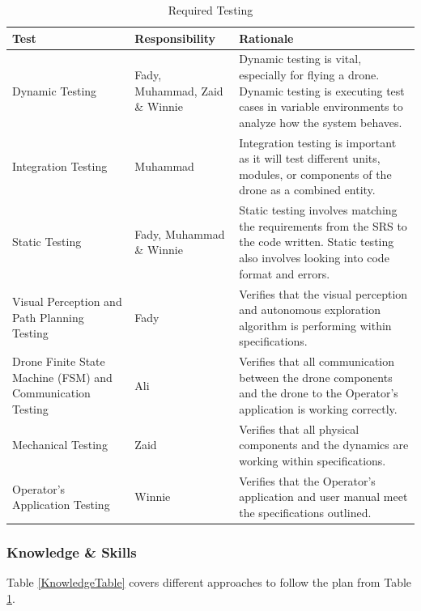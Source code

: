 \documentclass[12pt, titlepage]{article}
\begin{document}
  
\begin{table}[!h]
\begin{center}
\caption {Required Testing}
\label{RequiredTesting}
\begin{tabular}{ | m{3cm} | m{3cm} | m{8cm} | }
\hline
Test & Responsibility & Rationale\\
\hline
Dynamic Testing & Fady, Muhammad, Zaid \& Winnie & Dynamic testing is vital, especially for flying a drone. Dynamic testing is executing test cases in variable environments to analyze how the system behaves.\\
\hline
Integration Testing & Muhammad & Integration testing is important as it will test different units, modules, or components of the drone as a combined entity.\\
\hline
Static Testing & Fady, Muhammad \& Winnie & Static testing involves matching the requirements from the SRS to the code written. Static testing also involves looking into code format and errors. \\
\hline
 Visual Perception and Path Planning Testing & Fady & Verifies that the visual perception and autonomous exploration algorithm is performing within specifications. \\
\hline
Drone Finite State Machine (FSM) and Communication Testing & Ali & Verifies that all communication between the drone components and the drone to the Operator's application is working correctly. \\
\hline
Mechanical Testing & Zaid & Verifies that all physical components and the dynamics are working within specifications. \\
\hline
Operator's Application Testing & Winnie & Verifies that the Operator's application and user manual meet the specifications outlined.
\\
\hline
\end{tabular}
\end{center}
\end{table}

\subsubsection{Knowledge \& Skills}
Table \ref{KnowledgeTable} covers different approaches to follow the plan from Table \ref{RequiredTesting}.
\end{document}
